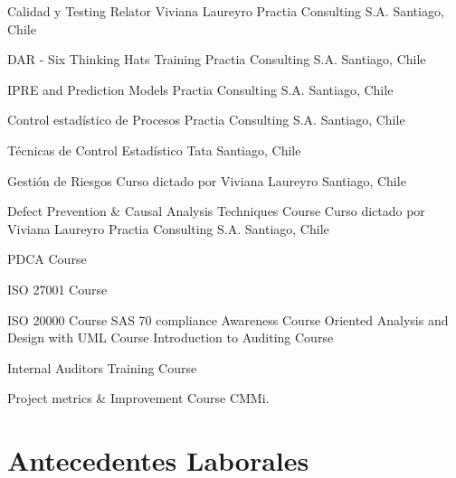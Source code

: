 \documentclass[11pt,letterpaper,roman]{moderncv}
\begin{document}
	{Calidad y Testing}
	{Relator Viviana Laureyro}
	{}
	{Practia Consulting S.A.}
	{Santiago, Chile}



	{DAR - Six Thinking Hats Training}
	{}
	{}
	{Practia Consulting S.A.}
	{Santiago, Chile}

	{IPRE and Prediction Models}
	{}
	{}
	{Practia Consulting S.A.}
	{Santiago, Chile}
	
	{Control estadístico de Procesos}
	{}
	{}
	{Practia Consulting S.A.}
	{Santiago, Chile}
	
	
	{Técnicas de Control Estadístico}
	{}
	{}
	{Tata}
	{Santiago, Chile}
	
	{Gestión de Riesgos}
	{Curso dictado por Viviana Laureyro}
	{}
	{}
	{Santiago, Chile}

	{Defect Prevention \& Causal Analysis Techniques Course}
	{Curso dictado por Viviana Laureyro}
	{}
	{Practia Consulting S.A.}
	{Santiago, Chile}
	

	{PDCA Course}
	{}
	{}
	{}
	{}
	
	
	{ISO 27001 Course}
	{}
	{}
	{}
	{}
	
	{ISO 20000 Course}
	{}
	{}
	{}
	{}
	{SAS 70 compliance Awareness Course}
	{}
	{}
	{}
	{}
	{Oriented Analysis and Design with UML Course}
	{}
	{}
	{}
	{}
	{Introduction to Auditing Course}
	{}
	{}
	{}
	{}
	
	{Internal Auditors Training Course}
	{}
	{}
	{}
	{}
	
	{Project metrics \& Improvement Course}
	{}
	{}
	{}
	{}
	{CMMi.}
	{}
	{}
	{}
	{}
	
	
\section{Antecedentes Laborales}
\end{document}
